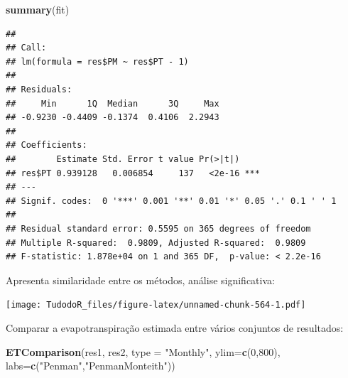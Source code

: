 \documentclass[
]{book}
\newenvironment{Shaded}{\begin{snugshade}}{\end{snugshade}}
\newcommand{\DataTypeTok}[1]{\textcolor[rgb]{0.13,0.29,0.53}{#1}}
\newcommand{\DecValTok}[1]{\textcolor[rgb]{0.00,0.00,0.81}{#1}}
\newcommand{\KeywordTok}[1]{\textcolor[rgb]{0.13,0.29,0.53}{\textbf{#1}}}
\newcommand{\NormalTok}[1]{#1}
\newcommand{\OperatorTok}[1]{\textcolor[rgb]{0.81,0.36,0.00}{\textbf{#1}}}
\newcommand{\StringTok}[1]{\textcolor[rgb]{0.31,0.60,0.02}{#1}}
\begin{document}
\begin{Shaded}
\begin{Highlighting}[]
\KeywordTok{summary}\NormalTok{(fit)}
\end{Highlighting}
\end{Shaded}

\begin{verbatim}
## 
## Call:
## lm(formula = res$PM ~ res$PT - 1)
## 
## Residuals:
##     Min      1Q  Median      3Q     Max 
## -0.9230 -0.4409 -0.1374  0.4106  2.2943 
## 
## Coefficients:
##        Estimate Std. Error t value Pr(>|t|)    
## res$PT 0.939128   0.006854     137   <2e-16 ***
## ---
## Signif. codes:  0 '***' 0.001 '**' 0.01 '*' 0.05 '.' 0.1 ' ' 1
## 
## Residual standard error: 0.5595 on 365 degrees of freedom
## Multiple R-squared:  0.9809, Adjusted R-squared:  0.9809 
## F-statistic: 1.878e+04 on 1 and 365 DF,  p-value: < 2.2e-16
\end{verbatim}

Apresenta similaridade entre os métodos, análise significativa:

\begin{Shaded}
\end{Shaded}

\texttt{[image: TudodoR\_files/figure-latex/unnamed-chunk-564-1.pdf]}

Comparar a evapotranspiração estimada entre vários conjuntos de resultados:

\begin{Shaded}
\begin{Highlighting}[]
\KeywordTok{ETComparison}\NormalTok{(res1, res2, }\DataTypeTok{type =} \StringTok{"Monthly"}\NormalTok{, }\DataTypeTok{ylim=}\KeywordTok{c}\NormalTok{(}\DecValTok{0}\NormalTok{,}\DecValTok{800}\NormalTok{),}
             \DataTypeTok{labs=}\KeywordTok{c}\NormalTok{(}\StringTok{"Penman"}\NormalTok{,}\StringTok{"PenmanMonteith"}\NormalTok{))}
\end{Highlighting}
\end{Shaded}
\end{document}
